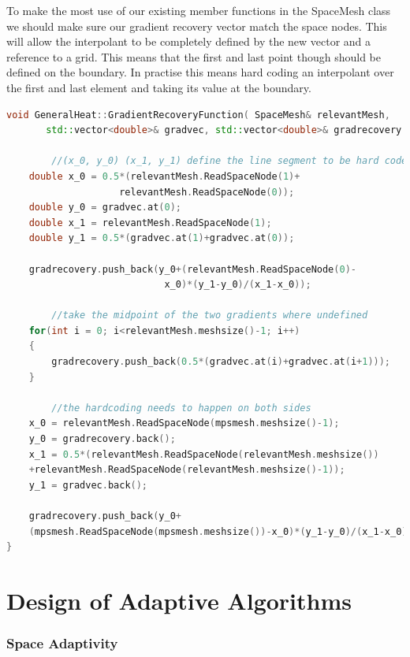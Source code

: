 \documentclass{uonmathreport}
\theoremstyle{definition}
\theoremstyle{problem}
\theoremstyle{theorem}
\begin{document}
To make the most use of our existing member functions in the SpaceMesh class we should make sure our gradient recovery vector match the space nodes. This will allow the interpolant to be completely defined by the new vector and a reference to a grid. This means that the first and last point though should be defined on the boundary. In practise this means hard coding an interpolant over the first and last element and taking its value at the boundary.

\begin{lstlisting}[language=C++]
void GeneralHeat::GradientRecoveryFunction( SpaceMesh& relevantMesh,
       std::vector<double>& gradvec, std::vector<double>& gradrecovery ) {
    	
    	//(x_0, y_0) (x_1, y_1) define the line segment to be hard coded
    double x_0 = 0.5*(relevantMesh.ReadSpaceNode(1)+
    				relevantMesh.ReadSpaceNode(0));
    double y_0 = gradvec.at(0);
    double x_1 = relevantMesh.ReadSpaceNode(1);
    double y_1 = 0.5*(gradvec.at(1)+gradvec.at(0));

    gradrecovery.push_back(y_0+(relevantMesh.ReadSpaceNode(0)-
    						x_0)*(y_1-y_0)/(x_1-x_0));
		
		//take the midpoint of the two gradients where undefined
    for(int i = 0; i<relevantMesh.meshsize()-1; i++)
    {
        gradrecovery.push_back(0.5*(gradvec.at(i)+gradvec.at(i+1)));
    }
		
		//the hardcoding needs to happen on both sides
    x_0 = relevantMesh.ReadSpaceNode(mpsmesh.meshsize()-1);
    y_0 = gradrecovery.back();
    x_1 = 0.5*(relevantMesh.ReadSpaceNode(relevantMesh.meshsize())			   
    +relevantMesh.ReadSpaceNode(relevantMesh.meshsize()-1));
    y_1 = gradvec.back();

    gradrecovery.push_back(y_0+
    (mpsmesh.ReadSpaceNode(mpsmesh.meshsize())-x_0)*(y_1-y_0)/(x_1-x_0));
}

\end{lstlisting}



\newpage

\section{Design of Adaptive Algorithms} \label{sec:Adaptive}



\subsubsection{Space Adaptivity} \label{subsubsec:KK Implementation}
\end{document}

